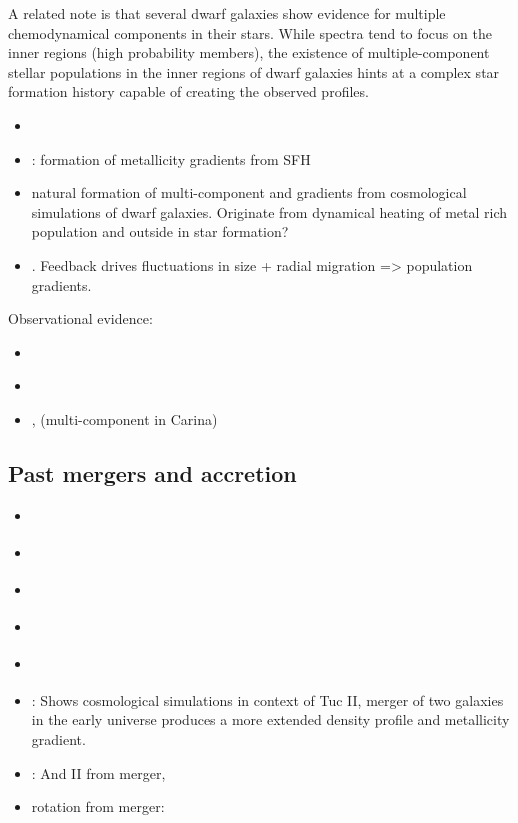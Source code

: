 A related note is that several dwarf galaxies show evidence for multiple
chemodynamical components in their stars. While spectra tend to focus on
the inner regions (high probability members), the existence of
multiple-component stellar populations in the inner regions of dwarf
galaxies hints at a complex star formation history capable of creating
the observed profiles.

\begin{itemize}
\tightlist
\item
  \citet{benitez-llambay+2016}
\item
  \citet{mercado+2021}: formation of metallicity gradients from SFH
\item
  \citet{revaz+jablonka2018} natural formation of multi-component and
  gradients from cosmological simulations of dwarf galaxies. Originate
  from dynamical heating of metal rich population and outside in star
  formation?
\item
  \citet{el-badry+2016}. Feedback drives fluctuations in size + radial
  migration =\textgreater{} population gradients.
\end{itemize}

Observational evidence:

\begin{itemize}
\tightlist
\item
  \citet{arronyo-polonio+2024}
\item
  \citet{pace+2020}
\item
  \citet{fabrizio+2016}, \citet{kordopatis+2016} (multi-component in
  Carina)
\end{itemize}

\subsection{Past mergers and
accretion}\label{past-mergers-and-accretion}

\begin{itemize}
\tightlist
\item
  \citet{deason+2014}
\item
  \citet{deason+2022}
\item
  \citet{ricotti+2022}
\item
  \citet{querci+2025}
\item
  \citet{amorisco+evans+vandeven2014}
\item
  \citet{tarumi+yoshida+frebel2021}: Shows cosmological simulations in
  context of Tuc II, merger of two galaxies in the early universe
  produces a more extended density profile and metallicity gradient.
\item
  \citet{lokas+2014}: And II from merger,
\item
  rotation from merger: \citet{cardona-barrero+2021}
\end{itemize}

